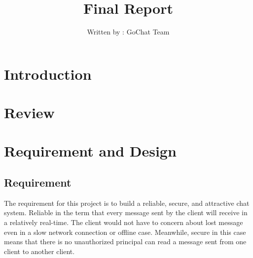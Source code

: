 \documentclass[a4paper,11pt]{article}
\title{Final Report}
\author{Written by : GoChat Team}
\begin{document}
\maketitle


\section{Introduction}













\section{Review}

\section{Requirement and Design}



\subsection{Requirement}
The requirement for this project is to build a reliable, secure, and attractive chat system. Reliable in the term that every message sent by the client will receive in a relatively real-time. The client would not have to concern about lost message even in a slow network connection or offline case. Meanwhile, secure in this case means that there is no unauthorized principal can read a message sent from one client to another client.
\end{document}
